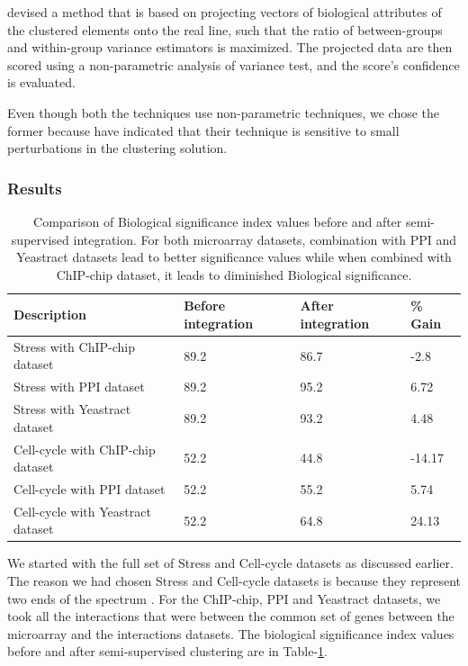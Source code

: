 \citet{gatviks03scoring} devised a method that is based on projecting vectors of biological attributes of the clustered elements onto the real line, such that the ratio 
of between-groups and within-group variance estimators is maximized. The projected data are then scored using a non-parametric analysis of variance test, and the 
score's conﬁdence is evaluated.

Even though both the techniques use non-parametric techniques, we chose the former because \citet{gatviks03scoring} have indicated that their technique is sensitive to small perturbations in 
the clustering solution.  


\subsubsection{Results}
\begin{table}
\centering
\begin{tabular}{|l|l|l|l|}
\hline
Description & Before integration & After integration & \% Gain\\
\hline
Stress with ChIP-chip dataset & 89.2 & 86.7 & -2.8\\
Stress with PPI dataset & 89.2 & 95.2 & 6.72\\
Stress with Yeastract dataset & 89.2 & 93.2 & 4.48\\
\hline
Cell-cycle with ChIP-chip dataset & 52.2 & 44.8 & -14.17\\
Cell-cycle with PPI dataset & 52.2 & 55.2 & 5.74\\
Cell-cycle with Yeastract dataset & 52.2 & 64.8 & 24.13\\
\hline 
\end{tabular}
\caption[Comparison of Biological significance index values before and after semi-supervised integration.]{Comparison of Biological significance 
index values before and after semi-supervised integration. For both microarray datasets, combination with PPI and Yeastract datasets lead to better significance values while
when combined with ChIP-chip dataset, it leads to diminished Biological significance.}
\label{tab:biol_significance}
\end{table}

We started with the full set of Stress and Cell-cycle datasets as discussed earlier. The reason we had chosen Stress and Cell-cycle datasets is because they represent two ends of the spectrum \citep{amos05integrative}. 
For the ChIP-chip, PPI and Yeastract datasets, we took all the interactions that were between the common set of genes between the microarray and the interactions datasets. 
The biological significance index values before and after semi-supervised clustering are in Table-\ref{tab:biol_significance}. 

